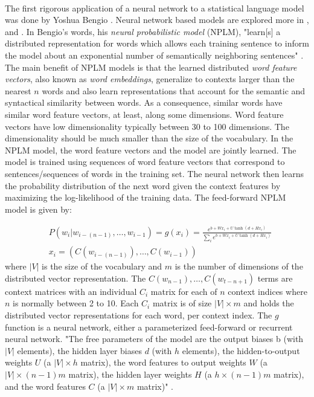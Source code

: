 \paragraph{}
The first rigorous application of a neural network to a statistical language model was done by Yoshua Bengio \cite{Bengio2003}. Neural network based models are explored more in \cite{Collobert2008}, and \cite{HuangEtAl2012}. In Bengio's words, his \emph{neural probabilistic model} (NPLM), "learn[s] a distributed representation for words which allows each training sentence to inform the model about an exponential number of semantically neighboring sentences" \cite[pg. 1137]{Bengio2003}. The main benefit of NPLM models is that the learned distributed \emph{word feature vectors}, also known as \emph{word embeddings}, generalize to contexts larger than the nearest $n$ words and also learn representations that account for the semantic and syntactical similarity between words. As a consequence, similar words have similar word feature vectors, at least, along some dimensions. Word feature vectors have low dimensionality typically between 30 to 100 dimensions. The dimensionality should be much smaller than the size of the vocabulary. In the NPLM model, the word feature vectors and the model are jointly learned. The model is trained using sequences of word feature vectors that correspond to sentences/sequences of words in the training set. The neural network then learns the probability distribution of the next word given the context features by maximizing the log-likelihood of the training data. 
The feed-forward NPLM model is given by:

\begin{align}
&P(w_i | w_{i-(n-1)},\dots, w_{i-1}) = g(x_i) = \frac {e^{b+Wx_i+U \tanh(d+Hx_i)}} {\sum_i e^{b+Wx_i+U \tanh(d+Hx_i)}} \label{FFNN}
\\
&x_i=\left(C(w_{i-(n-1)}), \dots, C(w_{i-1}) \right) \nonumber
\end{align}
where $|V|$ is the size of the vocabulary and $m$ is the number of dimensions of the distributed vector representation. The $C(w_{n-1}), \dots, C(w_{t-n+1})$ terms are context matrices with an individual $C_i$ matrix for each of $n$ context indices where $n$ is normally between 2 to 10. Each $C_i$ matrix is of size $|V|\times m$ and holds the distributed vector representations for each word, per context index. The $g$ function is a neural network, either a parameterized feed-forward or recurrent neural network. 
"The free parameters of the model are the output biases b (with $|V|$ elements), the hidden layer biases $d$ (with $h$ elements), the hidden-to-output weights $U$ (a $|V| \times h$ matrix), the word features to output weights $W$ (a $|V| \times (n-1)m$ matrix), the hidden layer weights $H$ (a $h \times (n-1)m$ matrix), and the word features $C$ (a $|V| \times m$ matrix)" \cite[pg. 1143]{Bengio2003}.
